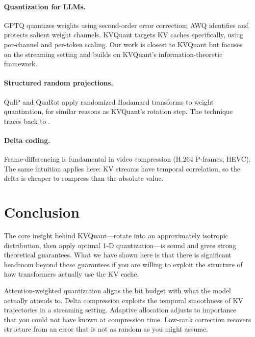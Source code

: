 \documentclass[11pt]{article}
\begin{document}
\paragraph{Quantization for LLMs.}
GPTQ \citep{frantar2022gptq} quantizes weights using second-order error
correction; AWQ \citep{lin2024awq} identifies and protects salient weight
channels. KVQuant \citep{hooper2024kvquant} targets KV caches specifically,
using per-channel and per-token scaling. Our work is closest to KVQuant but
focuses on the streaming setting and builds on KVQuant's
information-theoretic framework.

\paragraph{Structured random projections.}
QuIP \citep{chee2023quip} and QuaRot \citep{ashkboos2024quarot} apply
randomized Hadamard transforms to weight quantization, for similar reasons
as KVQuant's rotation step. The technique traces back to
\citet{ailon2006}.

\paragraph{Delta coding.}
Frame-differencing is fundamental in video compression (H.264 P-frames,
HEVC). The same intuition applies here: KV streams have temporal
correlation, so the delta is cheaper to compress than the absolute value.

\section{Conclusion}

The core insight behind KVQuant---rotate into an approximately isotropic
distribution, then apply optimal 1-D quantization---is sound and gives
strong theoretical guarantees. What we have shown here is that there is
significant headroom beyond those guarantees if you are willing to exploit
the structure of how transformers actually use the KV cache.

Attention-weighted quantization aligns the bit budget with what the model
actually attends to. Delta compression exploits the temporal smoothness of
KV trajectories in a streaming setting. Adaptive allocation adjusts to
importance that you could not have known at compression time. Low-rank
correction recovers structure from an error that is not as random as you
might assume.
\end{document}
